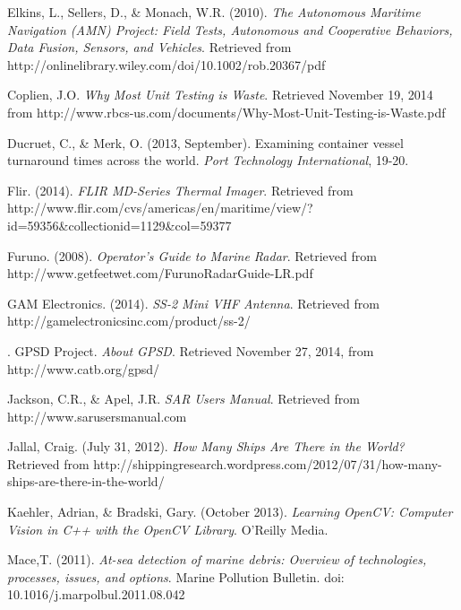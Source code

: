 \begin{thebibliography}{99}
\raggedright


 Elkins, L., Sellers, D., \& Monach, W.R. (2010). \textit{The Autonomous Maritime Navigation (AMN) Project: Field Tests, Autonomous and Cooperative Behaviors, Data Fusion, Sensors, and Vehicles}. Retrieved from http://onlinelibrary.wiley.com/doi/10.1002/rob.20367/pdf

 Coplien, J.O. \textit{Why Most Unit Testing is Waste}. Retrieved November 19, 2014 from http://www.rbcs-us.com/documents/Why-Most-Unit-Testing-is-Waste.pdf

 Ducruet, C., \& Merk, O. (2013, September). Examining container vessel turnaround times across the world. \textit{Port Technology International}, 19-20.

 Flir. (2014). \textit{FLIR MD-Series Thermal Imager}. Retrieved from http://www.flir.com/cvs/americas/en/maritime/view/?id=59356\&collectionid=1129\&col=59377

 Furuno. (2008). \textit{Operator's Guide to Marine Radar}. Retrieved from http://www.getfeetwet.com/FurunoRadarGuide-LR.pdf

 GAM Electronics. (2014). \textit{SS-2 Mini VHF Antenna}. Retrieved from http://gamelectronicsinc.com/product/ss-2/

. GPSD Project. \textit{About GPSD}. Retrieved November 27, 2014, from http://www.catb.org/gpsd/

 Jackson, C.R., \& Apel, J.R. \textit{SAR Users Manual}. Retrieved from http://www.sarusersmanual.com

 Jallal, Craig. (July 31, 2012). \textit{How Many Ships Are There in the World?} Retrieved from http://shippingresearch.wordpress.com/2012/07/31/how-many-ships-are-there-in-the-world/

 Kaehler, Adrian, \& Bradski, Gary. (October 2013). \textit{Learning OpenCV: Computer Vision in C++ with the OpenCV Library}. O'Reilly Media.

 Mace,T. (2011). \textit{At-sea detection of marine debris: Overview of technologies, processes, issues, and options}. Marine Pollution Bulletin. doi: 10.1016/j.marpolbul.2011.08.042


\end{thebibliography}
